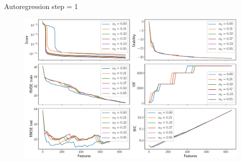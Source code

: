 \documentclass[9pt]{beamer}
\begin{document}
\begin{frame}{Autoregression step = 1}
	\begin{figure}
		\includegraphics[width=\linewidth]{figs/ecog_3_metrics.eps}
	\end{figure}
\end{frame}
\end{document}
